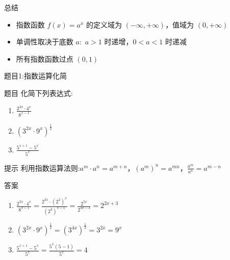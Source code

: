   
  
  
  \begin{frame}{总结}
    \begin{itemize}
        \item 指数函数 \( f(x) = a^x \) 的定义域为 \( (-\infty, +\infty) \)，值域为 \( (0, +\infty) \)
        \item 单调性取决于底数 \( a \):\ \( a > 1 \) 时递增，\( 0 < a < 1 \) 时递减
        \item 所有指数函数过点 \((0,1)\)
  
    \end{itemize}
    
  \end{frame}
  
  
  \begin{frame}{题目1:指数运算化简}
    \begin{block}{题目}
        化简下列表达式:
        \begin{enumerate}
            \item $\frac{2^{3x} \cdot 4^x}{8^{x-1}}$
            \item $(3^{2x} \cdot 9^x)^{\frac{1}{2}}$
            \item $\frac{5^{x+1} - 5^x}{5^x}$
        \end{enumerate}
    \end{block}
    
    \begin{alertblock}{提示}
        利用指数运算法则:$a^m \cdot a^n = a^{m+n}$，$(a^m)^n = a^{mn}$，$\frac{a^m}{a^n} = a^{m-n}$
    \end{alertblock}
    \pause
      
      \begin{block}{答案}
          \begin{enumerate}
              \item $\frac{2^{3x} \cdot 4^x}{8^{x-1}} = \frac{2^{3x} \cdot (2^2)^x}{(2^3)^{x-1}} = \frac{2^{5x}}{2^{3x-3}} = 2^{2x+3}$
              \item $(3^{2x} \cdot 9^x)^{\frac{1}{2}} = (3^{4x})^{\frac{1}{2}} = 3^{2x} = 9^x$
              \item $\frac{5^{x+1} - 5^x}{5^x} = \frac{5^x(5-1)}{5^x} = 4$
          \end{enumerate}
      \end{block}
  \end{frame}
  
  
  

